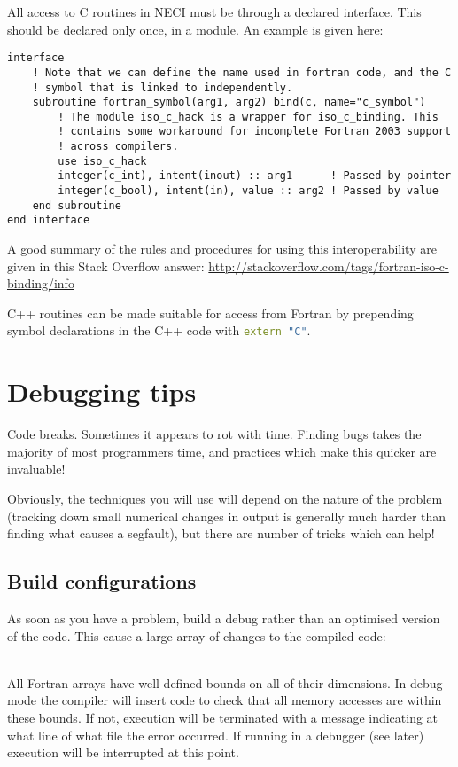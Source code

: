 \documentclass[a4paper,notitlepage]{scrreprt}
\newcommand\headitem[1]{\needspace{1.5\baselineskip}\item[{\boldmath #1 \nopagebreak}] \hfill \\ \nopagebreak}
\let\code\lstinline
\begin{document}
{{{All access to C routines in NECI must be through a declared interface. This
should be declared only once, in a module. An example is given here:
\begin{lstlisting}
interface
	! Note that we can define the name used in fortran code, and the C
	! symbol that is linked to independently.
	subroutine fortran_symbol(arg1, arg2) bind(c, name="c_symbol")
		! The module iso_c_hack is a wrapper for iso_c_binding. This
		! contains some workaround for incomplete Fortran 2003 support
		! across compilers.
		use iso_c_hack
		integer(c_int), intent(inout) :: arg1      ! Passed by pointer
		integer(c_bool), intent(in), value :: arg2 ! Passed by value
	end subroutine
end interface
\end{lstlisting}
A good summary of the rules and procedures for using this interoperability are
given in this Stack Overflow answer:
\url{http://stackoverflow.com/tags/fortran-iso-c-binding/info}

C++ routines can be made suitable for access from Fortran by prepending symbol
declarations in the C++ code with \code[language=C++]{extern "C"}.

\section{Debugging tips}
Code breaks. Sometimes it appears to rot with time. Finding bugs takes the
majority of most programmers time, and practices which make this quicker are
invaluable!

Obviously, the techniques you will use will depend on the nature of the
problem (tracking down small numerical changes in output is generally much
harder than finding what causes a segfault), but there are number of tricks
which can help!

\subsection{Build configurations}
As soon as you have a problem, build a debug rather than an optimised version
of the code. This cause a large array of changes to the compiled code:
\begin{description}
	\headitem{Array bounds checking}
		All Fortran arrays have well defined bounds on all of their dimensions.
		In debug mode the compiler will insert code to check that all memory
		accesses are within these bounds. If not, execution will be terminated
		with a message indicating at what line of what file the error occurred.
		If running in a debugger (see later) execution will be interrupted at
		this point.


\end{description}}}}
\end{document}
